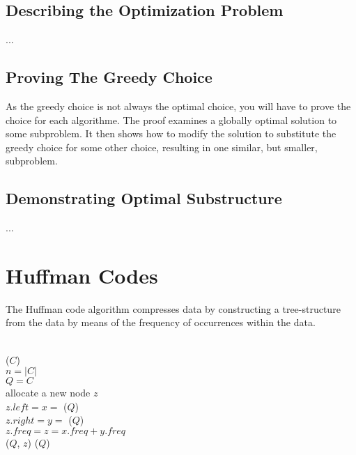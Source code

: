 \subsection{Describing the Optimization Problem}
...

\subsection{Proving The Greedy Choice}
As the greedy choice is not always the optimal choice, you will have to prove
the choice for each algorithme. The proof examines a globally optimal solution
to some subproblem. It then shows how to modify the solution to substitute the
greedy choice for some other choice, resulting in one similar, but smaller,
subproblem.

\subsection{Demonstrating Optimal Substructure}
...

\clearpage
\section{Huffman Codes}
The Huffman code algorithm compresses data by constructing a tree-structure
from the data by means of the frequency of occurrences within the data.
\\\\
\begin{algorithm}[H]
	
	
	\BlankLine
	
	\HuffmanCode($C$) \\
	\Begin
	{
		$n = |C|$ \\
		$Q = C$ \\
		{
			allocate a new node $z$ \\
			$z.left = x = $ \ExtractMin($Q$) \\
			$z.right = y = $ \ExtractMin($Q$) \\
			$z.freq = z = x.freq + y.freq$ \\
			\Insert($Q$, $z$)
		}
		\Return \ExtractMin($Q$)
	}
\end{algorithm}

